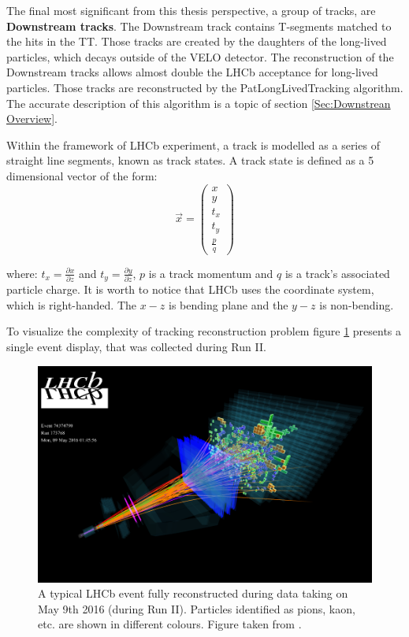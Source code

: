 The final most significant from this thesis perspective, a group of tracks, are \textbf{Downstream tracks}. The Downstream track contains T-segments matched to the hits in the TT. Those tracks are created by the daughters of the long-lived particles, which decays outside of the VELO detector. The reconstruction of the Downstream tracks allows almost double the LHCb acceptance for long-lived particles. Those tracks are reconstructed by the PatLongLivedTracking algorithm. 
The accurate description of this algorithm is a topic of section \ref{Sec:Downstrean Overview}. 

Within the framework of LHCb experiment, a track is modelled as a series of straight line segments, known as track states. A track state is defined as a 5 dimensional vector of the form:
\begin{equation}
    \vec{x} = \begin{pmatrix}
    x \\ y \\ t_{x} \\ t_{y} \\ \frac{p}{q} 
    \end{pmatrix}
\end{equation}

where: $t_x = \frac{\partial x}{\partial z}$ and $t_y = \frac{\partial y}{\partial z}$, $p$ is a track momentum and $q$ is a track's associated particle charge. It is worth to notice that LHCb uses the coordinate system, which is right-handed. The $x-z$ is bending plane and the $y-z$ is non-bending. 


To visualize the complexity of tracking reconstruction problem figure \ref{fig:event display} presents a single event display, that was collected during Run II.   

\begin{figure}[h]
\centering
\includegraphics[scale=0.9]{figures/LHCb7_event.png}
\caption{A typical LHCb event fully reconstructed during data taking on May 9th 2016 (during Run II). Particles identified as pions, kaon, etc. are shown in different colours. Figure taken from \cite{LHCb_event_display}.
\label{fig:event display}}
\end{figure}

